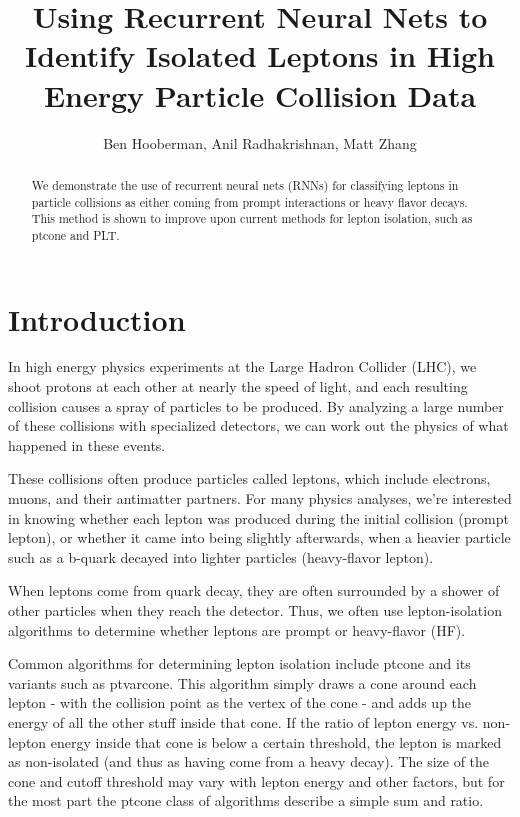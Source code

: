 \documentclass[preprint,12pt]{elsarticle}
\begin{document}
\begin{frontmatter}

\title{Using Recurrent Neural Nets to Identify Isolated Leptons in High Energy Particle Collision Data}

\author{Ben Hooberman, Anil Radhakrishnan, Matt Zhang}

\address{UIUC}

\begin{abstract}
We demonstrate the use of recurrent neural nets (RNNs) for classifying leptons in particle collisions as either coming from prompt interactions or heavy flavor decays. This method is shown to improve upon current methods for lepton isolation, such as ptcone and PLT.
\end{abstract}

\end{frontmatter}

\section{Introduction}\label{sec:intro}


In high energy physics experiments at the Large Hadron Collider (LHC), we shoot protons at each other at nearly the speed of light, and each resulting collision causes a spray of particles to be produced. By analyzing a large number of these collisions with specialized detectors, we can work out the physics of what happened in these events.

These collisions often produce particles called leptons, which include electrons, muons, and their antimatter partners. For many physics analyses, we're interested in knowing whether each lepton was produced during the initial collision (prompt lepton), or whether it came into being slightly afterwards, when a heavier particle such as a b-quark decayed into lighter particles (heavy-flavor lepton).

When leptons come from quark decay, they are often surrounded by a shower of other particles when they reach the detector. Thus, we often use lepton-isolation algorithms to determine whether leptons are prompt or heavy-flavor (HF).


Common algorithms for determining lepton isolation include ptcone and its variants such as ptvarcone. This algorithm simply draws a cone around each lepton - with the collision point as the vertex of the cone - and adds up the energy of all the other stuff inside that cone. If the ratio of lepton energy vs. non-lepton energy inside that cone is below a certain threshold, the lepton is marked as non-isolated (and thus as having come from a heavy decay). The size of the cone and cutoff threshold may vary with lepton energy and other factors, but for the most part the ptcone class of algorithms describe a simple sum and ratio.
\end{document}
